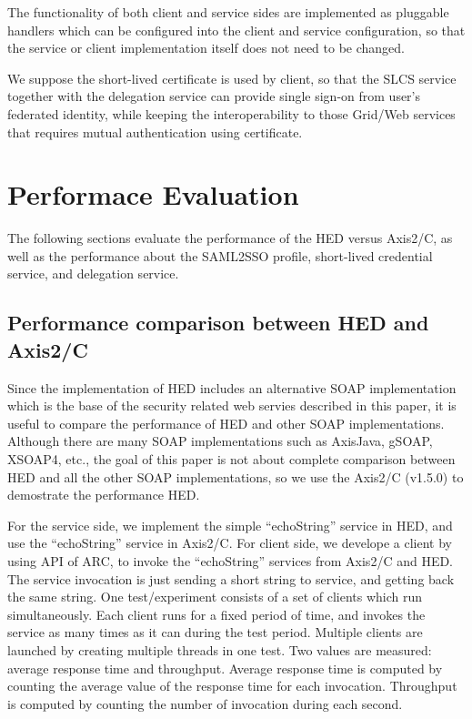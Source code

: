 \documentclass[conference]{IEEEtran}
\begin{document}
The functionality of both client and service sides are implemented as pluggable handlers which can be 
configured into the client and service configuration, so that the service or client implementation itself
does not need to be changed.

We suppose the short-lived certificate is used by client, so that the SLCS service together with
the delegation service can provide single sign-on from user's federated identity, while keeping the 
interoperability to those Grid/Web services that requires mutual authentication using certificate.

\section{Performace Evaluation}
\label{sec:perfeval}
The following sections evaluate the performance of the HED versus Axis2/C, as 
well as the performance about the SAML2SSO profile, short-lived credential
service, and delegation service.

\subsection{Performance comparison between HED and Axis2/C}
\label{sec:perhedandaxis}
Since the implementation of HED includes an alternative SOAP implementation which is the base of 
the security related web servies described in this paper, it is useful to compare the performance 
of HED and other SOAP implementations. Although there are many SOAP implementations such as 
AxisJava, gSOAP, XSOAP4, etc., the goal of this paper is not about complete comparison between
HED and all the other SOAP implementations, so we use the Axis2/C (v1.5.0) to demostrate the performance
HED.

For the service side, we implement the simple ``echoString'' service in HED, and use the ``echoString''
service in Axis2/C. For client side, we develope a client by using API of ARC, to invoke the ``echoString''
services from Axis2/C and HED. The service invocation is just sending a short string to service, and 
getting back the same string. One test/experiment consists of a set of clients which run simultaneously. 
Each client runs for a fixed period of time, and invokes the service as many times as it can during 
the test period. Multiple clients are launched by creating multiple threads in one test.
Two values are measured: average response time and throughput. Average response time is computed
by counting the average value of the response time for each invocation. Throughput is computed
by counting the number of invocation during each second.
\end{document}
